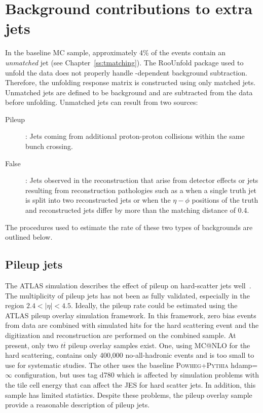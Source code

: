 \section{Background contributions to extra jets}
\label{ss:pileup}
In the baseline MC sample, approximately 4\% of the events contain an \textit{unmatched} jet (see Chapter~\ref{ss:tmatching}). The RooUnfold package used to unfold the data does not properly handle \pT-dependent background subtraction. Therefore, the unfolding response matrix is constructed using only matched jets. Unmatched jets are defined to be background and are subtracted from the data before unfolding. 
Unmatched jets can result from two sources: 
\begin{description}
\item[Pileup]: Jets coming from additional proton-proton collisions within the same bunch crossing.
\item[False]: Jets observed in the reconstruction that arise from detector effects or jets resulting from reconstruction pathologies such as a when a single truth jet is split into two reconstructed jets or when the $\eta-\phi$ positions of the truth and reconstructed jets differ by more than the matching distance of 0.4.
\end{description}
The  procedures used to estimate the rate of these two types of backgrounds are outlined below.

\subsection{Pileup jets}


The ATLAS simulation describes the effect of pileup on hard-scatter jets well~\cite{jetpile}. The multiplicity of pileup jets has not been as fully validated, especially in the region $2.4 <  |\eta| < 4.5$.  Ideally, the pileup rate could be
estimated using the ATLAS pileup overlay simulation framework.  In this framework,
zero bias events from data are combined with simulated hits for the hard scattering event
and the digitization and reconstruction are performed on the combined sample.  At present,
only two $t\overline t$ pileup overlay samples exist.  One, using \textsc{ MC@NLO} for the hard scattering,
contains only 400,000 no-all-hadronic events and is too small to use for
systematic studies.  The other uses the baseline \textsc{ Powheg+Pythia} hdamp=$\infty$
configuration, but uses tag d780 which  is affected by simulation problems with the tile cell 
energy that can affect the JES for hard scatter jets.  In addition, this sample has
limited statistics.   Despite these problems, the pileup overlay sample
provide a reasonable description of pileup jets.%

